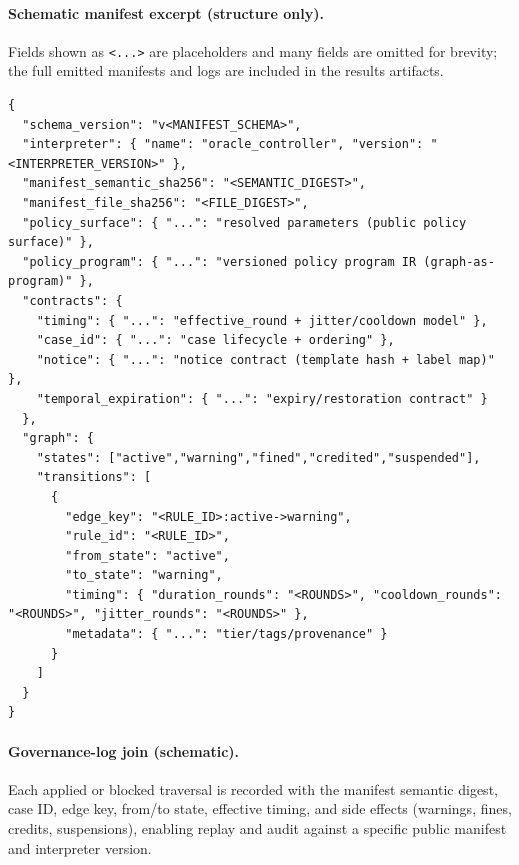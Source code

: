 \documentclass[11pt, a4paper]{article}
\begin{document}
\paragraph{Schematic manifest excerpt (structure only).}
Fields shown as \texttt{<...>} are placeholders and many fields are omitted for brevity; the full emitted manifests and logs are included in the results artifacts.
\begin{lstlisting}[style=promptbox]
{
  "schema_version": "v<MANIFEST_SCHEMA>",
  "interpreter": { "name": "oracle_controller", "version": "<INTERPRETER_VERSION>" },
  "manifest_semantic_sha256": "<SEMANTIC_DIGEST>",
  "manifest_file_sha256": "<FILE_DIGEST>",
  "policy_surface": { "...": "resolved parameters (public policy surface)" },
  "policy_program": { "...": "versioned policy program IR (graph-as-program)" },
  "contracts": {
    "timing": { "...": "effective_round + jitter/cooldown model" },
    "case_id": { "...": "case lifecycle + ordering" },
    "notice": { "...": "notice contract (template hash + label map)" },
    "temporal_expiration": { "...": "expiry/restoration contract" }
  },
  "graph": {
    "states": ["active","warning","fined","credited","suspended"],
    "transitions": [
      {
        "edge_key": "<RULE_ID>:active->warning",
        "rule_id": "<RULE_ID>",
        "from_state": "active",
        "to_state": "warning",
        "timing": { "duration_rounds": "<ROUNDS>", "cooldown_rounds": "<ROUNDS>", "jitter_rounds": "<ROUNDS>" },
        "metadata": { "...": "tier/tags/provenance" }
      }
    ]
  }
}
\end{lstlisting}
\paragraph{Governance-log join (schematic).}
Each applied or blocked traversal is recorded with the manifest semantic digest, case ID, edge key, from/to state, effective timing, and side effects (warnings, fines, credits, suspensions), enabling replay and audit against a specific public manifest and interpreter version.
\end{document}
